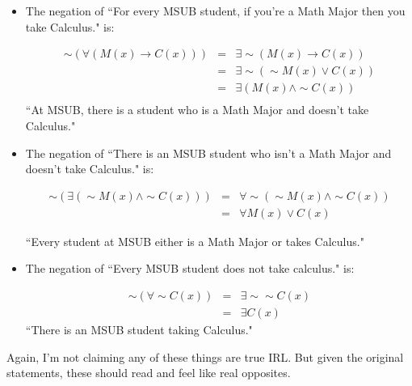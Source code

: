 \documentclass[10pt]{article}
\theoremstyle{definition}
\begin{document}
\begin{itemize}
\item The negation of ``For every MSUB student, if you're a Math Major then you take Calculus." is:

\begin{eqnarray*}
\sim(\forall (M(x)\to C(x)))&=&\exists\sim (M(x)\to C(x))\\
&=&\exists\sim (\sim M(x)\vee C(x))\\
&=&\exists(M(x)\wedge \sim C(x))\\
\end{eqnarray*}
``At MSUB, there is a student who is a Math Major and doesn't take Calculus."

\item The negation of ``There is an MSUB student who isn't a Math Major and doesn't take Calculus." is:

\begin{eqnarray*}
\sim(\exists (\sim M(x)\wedge \sim C(x)))&=&\forall \sim(\sim M(x)\wedge \sim C(x))\\
&=&\forall M(x)\vee C(x)
\end{eqnarray*}

``Every student at MSUB either is a Math Major or takes Calculus."

\item The negation of ``Every MSUB student does not take calculus." is:

\begin{eqnarray*}
\sim(\forall \sim C(x))&=&\exists \sim\sim C(x)\\
&=&\exists C(x)
\end{eqnarray*}
``There is an MSUB student taking Calculus."






\end{itemize}
Again, I'm not claiming any of these things are true IRL.  But given the original statements, these should read and feel like real opposites.
\end{document}
